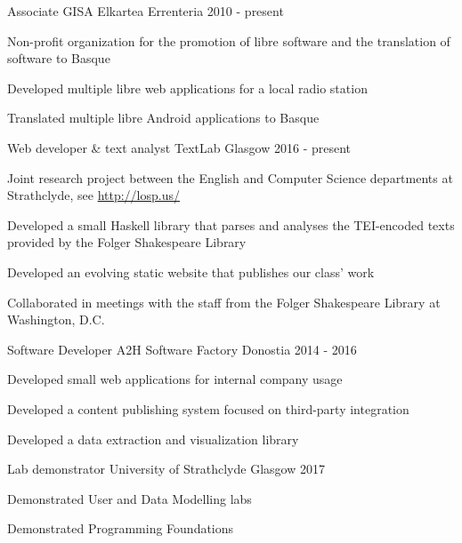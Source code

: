 \documentclass[11pt, a4paper]{awesome-cv}
\begin{document}
\begin{cventries}

    \cventry
      {Associate} %
      {GISA Elkartea} %
      {Errenteria} %
      {2010 - present} %
      {
        \begin{cvitems} %
          \item {Non-profit organization for the promotion of libre software and
              the translation of software to Basque}
          \item {Developed multiple libre web applications for a local radio
              station}
          \item {Translated multiple libre Android applications to Basque}
        \end{cvitems}
      }

    \cventry
      {Web developer \& text analyst} %
      {TextLab} %
      {Glasgow} %
      {2016 - present} %
      {
        \begin{cvitems} %
          \item {Joint research project between the English and Computer Science
              departments at Strathclyde, see \url{http://losp.us/}}
          \item {Developed a small Haskell library that parses and analyses the
              TEI-encoded texts provided by the Folger Shakespeare Library}
          \item {Developed an evolving static website that publishes our class'
              work}
          \item {Collaborated in meetings with the staff from the Folger
              Shakespeare Library at Washington, D.C.}
        \end{cvitems}
      }

    \cventry
      {Software Developer} %
      {A2H Software Factory} %
      {Donostia} %
      {2014 - 2016} %
      {
        \begin{cvitems} %
          \item {Developed small web applications for internal company usage}
          \item {Developed a content publishing system focused on third-party
              integration}
          \item {Developed a data extraction and visualization library}
        \end{cvitems}
      }

    \cventry
      {Lab demonstrator} %
      {University of Strathclyde} %
      {Glasgow} %
      {2017} %
      {
        \begin{cvitems} %
          \item {Demonstrated User and Data Modelling labs}
          \item {Demonstrated Programming Foundations}
        \end{cvitems}
      }

\end{cventries}
\end{document}
